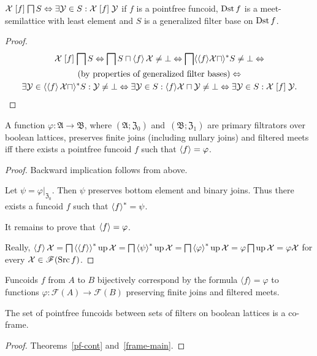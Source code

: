 \begin{prop}
$\mathcal{X}\mathrel{\left[f\right]}\bigsqcap S\Leftrightarrow\exists\mathcal{Y}\in S:\mathcal{X}\mathrel{\left[f\right]}\mathcal{Y}$
if $f$ is a pointfree funcoid, $\operatorname{Dst} f$ is a meet-semilattice with
least element and $S$ is a generalized filter base on $\operatorname{Dst} f$.\end{prop}
\begin{proof}
~
\begin{multline*}
\mathcal{X}\mathrel{\left[f\right]}\bigsqcap S\Leftrightarrow\bigsqcap S\sqcap\left\langle f\right\rangle\mathcal{X}\neq\bot\Leftrightarrow\bigsqcap\langle\langle f\rangle\mathcal{X}\sqcap\rangle^{\ast}S\neq\bot\Leftrightarrow\\
\text{(by properties of generalized filter bases)}\Leftrightarrow\\
\exists\mathcal{Y}\in\langle\left\langle f\right\rangle\mathcal{X}\sqcap\rangle^{\ast}S:\mathcal{Y}\neq\bot\Leftrightarrow\exists\mathcal{Y}\in S:\langle f\rangle\mathcal{X}\sqcap\mathcal{Y}\neq\bot\Leftrightarrow\exists\mathcal{Y}\in S:\mathcal{X}\mathrel{\left[f\right]}\mathcal{Y}.
\end{multline*}
\end{proof}
\begin{thm}
\label{pfcd-as-func}A function $\varphi:\mathfrak{A}\rightarrow\mathfrak{B}$,
where $(\mathfrak{A};\mathfrak{Z}_{0})$ and~$(\mathfrak{B};\mathfrak{Z}_{1})$
are primary filtrators over boolean lattices, preserves finite joins
(including nullary joins) and filtered meets iff there exists a pointfree
funcoid $f$ such that $\left\langle f\right\rangle=\varphi$.\end{thm}
\begin{proof}
Backward implication follows from above.

Let $\psi=\varphi|_{\mathfrak{Z}_{0}}$. Then $\psi$ preserves bottom
element and binary joins. Thus there exists a funcoid $f$ such that
$\left\langle f\right\rangle ^{\ast}=\psi$.

It remains to prove that $\left\langle f\right\rangle=\varphi$.

Really, $\left\langle f\right\rangle\mathcal{X}=\bigsqcap\left\langle \left\langle f\right\rangle\right\rangle ^{\ast}\operatorname{up}\mathcal{X}=\bigsqcap\left\langle \psi\right\rangle ^{\ast}\operatorname{up}\mathcal{X}=\bigsqcap\left\langle \varphi\right\rangle ^{\ast}\operatorname{up}\mathcal{X}=\varphi\bigsqcap\operatorname{up}\mathcal{X}=\varphi\mathcal{X}$
for every $\mathcal{X}\in\mathscr{F}(\operatorname{Src} f)$.\end{proof}
\begin{cor}
Funcoids $f$ from $A$ to $B$ bijectively correspond by the formula
$\langle f\rangle=\varphi$ to functions $\varphi:\mathscr{F}(A)\rightarrow\mathscr{F}(B)$
preserving finite joins and filtered meets.\end{cor}
\begin{thm}
The set of pointfree funcoids between sets of filters on boolean
lattices is a co-frame.\end{thm}
\begin{proof}
Theorems~\ref{pf-cont} and~\ref{frame-main}.
\end{proof}

